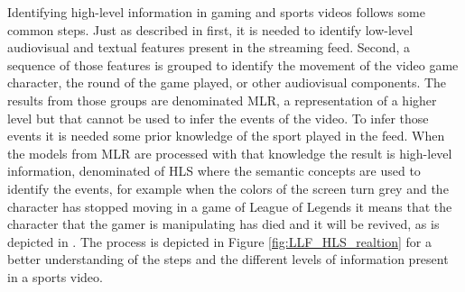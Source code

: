     Identifying high-level information in gaming and sports videos follows some common steps. Just as described in \cite{AutomaticEventDetectionTennis} first, it is needed to identify low-level audiovisual and textual features present in the streaming feed. Second, a sequence of those features is grouped to identify the movement of the video game character, the round of the game played, or other audiovisual components. The results from those groups are denominated \gls{MLR}, a representation of a higher level but that cannot be used to infer the events of the video. To infer those events it is needed some prior knowledge of the sport played in the feed. When the models from \gls{MLR} are processed with that knowledge the result is high-level information, denominated of \gls{HLS} where the semantic concepts are used to identify the events, for example when the colors of the screen turn grey and the character has stopped moving in a game of League of Legends it means that the character that the gamer is manipulating has died and it will be revived, as is depicted in \cite{BroadcatedGames_analysis_LOL}. The process is depicted in Figure \ref{fig:LLF_HLS_realtion} for a better understanding of the steps and the different levels of information present in a sports video.

